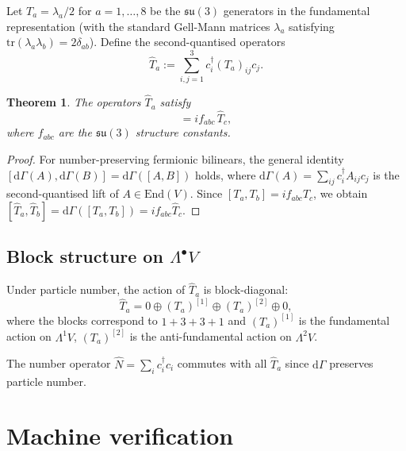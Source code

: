 \documentclass[12pt,a4paper]{article}
\newtheorem{theorem}{Theorem}[section]
\theoremstyle{definition}
\theoremstyle{remark}
\begin{document}
Let $T_a = \lambda_a/2$ for $a=1,\ldots,8$ be the $\mathfrak{su}(3)$ generators
in the fundamental representation (with the standard Gell-Mann matrices
$\lambda_a$ satisfying $\mathrm{tr}(\lambda_a\lambda_b) = 2\delta_{ab}$).
Define the second-quantised operators
\begin{equation}\label{eq:Thatdef}
  \hat{T}_a := \sum_{i,j=1}^3 c_i^\dagger (T_a)_{ij} c_j.
\end{equation}

\begin{theorem}\label{thm:su3_algebra}
The operators $\hat{T}_a$ satisfy
\begin{equation}
  [\hat{T}_a, \hat{T}_b] = i f_{abc}\,\hat{T}_c,
\end{equation}
where $f_{abc}$ are the $\mathfrak{su}(3)$ structure constants.
\end{theorem}

\begin{proof}
For number-preserving fermionic bilinears, the general identity
$[\mathrm{d}\Gamma(A), \mathrm{d}\Gamma(B)] = \mathrm{d}\Gamma([A,B])$
holds, where $\mathrm{d}\Gamma(A) = \sum_{ij} c_i^\dagger A_{ij} c_j$
is the second-quantised lift of $A\in\mathrm{End}(V)$.  Since
$[T_a, T_b] = if_{abc} T_c$, we obtain
$[\hat{T}_a, \hat{T}_b] = \mathrm{d}\Gamma([T_a,T_b]) = if_{abc}\hat{T}_c$.
\end{proof}

\subsection{Block structure on $\Lambda^\bullet V$}

Under particle number, the action of $\hat{T}_a$ is block-diagonal:
\begin{equation}
  \hat{T}_a = 0 \oplus (T_a)^{[1]} \oplus (T_a)^{[2]} \oplus 0,
\end{equation}
where the blocks correspond to $1+3+3+1$ and
$(T_a)^{[1]}$ is the fundamental action on $\Lambda^1 V$,
$(T_a)^{[2]}$ is the anti-fundamental action on $\Lambda^2 V$.

The number operator $\hat{N} = \sum_i c_i^\dagger c_i$ commutes with all
$\hat{T}_a$ since $\mathrm{d}\Gamma$ preserves particle number.

\section{Machine verification}
\label{sec:verification}
\end{document}
